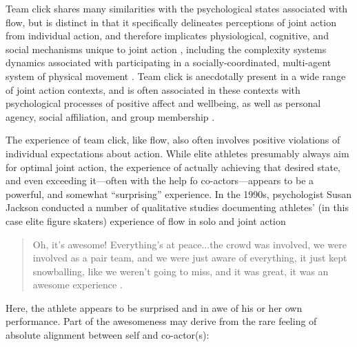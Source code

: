 \begin{CJK}{UTF8}{gbsn}

Team click shares many similarities with the psychological states associated with flow, but is distinct in that it specifically delineates perceptions of joint action from individual action, and therefore implicates physiological, cognitive, and social mechanisms unique to joint action \citep{Vesper2010}, including the complexity systems dynamics associated with participating in a socially-coordinated, multi-agent system of physical movement \citep{Kelso2009}.  Team click is anecdotally present in a wide range of joint action contexts, and is often associated in these contexts with psychological processes of positive affect and wellbeing, as well as personal agency, social affiliation, and group membership \citep{Jackson1995,Marsh2009,Wheatley2012,Slingerland2014}.


The experience of team click, like flow, also often involves positive violations of individual expectations about action.  While elite athletes presumably always aim for optimal joint action, the experience of actually achieving that desired state, and even exceeding it---often with the help fo co-actors---appears to be a powerful, and somewhat ``surprising'' experience.  In the 1990s, psychologist Susan Jackson conducted a number of qualitative studies documenting athletes' (in this case elite figure skaters) experience of flow in solo and joint action

    \begin{quote}
      Oh, it's awesome! Everything's at peace...the crowd was involved, we were involved as a pair team, and we were just aware of everything, it just kept snowballing, like we weren’t going to miss, and it was great, it was an awesome experience \citep[168]{Jackson1992}.
    \end{quote}

Here, the athlete appears to be surprised and in awe of his or her own performance.  Part of the awesomeness may derive from the rare feeling of absolute alignment between self and co-actor(s):


\end{CJK}

